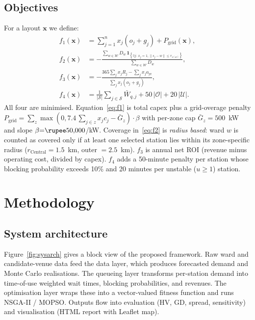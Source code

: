\documentclass[conference]{IEEEtran}
\begin{document}
\subsection{Objectives}
\label{subsec:objectives}
For a layout $\mathbf{x}$ we define:
\begin{align}
f_{1}(\mathbf{x})&= \sum_{j=1}^{n}x_{j}(o_{j}+g_{j})+P_{\text{grid}}(\mathbf{x}), \label{eq:f1}\\
f_{2}(\mathbf{x})&= -\frac{\sum_{w\in\mathcal{W}}D_{w}\,\mathbf{1}_{\left\{\exists j:\,x_{j}=1,\|s_{j}-w\|\le r_{z(w)}\right\}}}{\sum_{w\in\mathcal{W}}D_{w}}, \label{eq:f2}\\
f_{3}(\mathbf{x})&= -\frac{365\sum_{j}x_{j}R_{j}-\sum_{j}x_{j}o_{\text{yr}}}{\sum_{j}x_{j}(o_{j}+g_{j})}, \label{eq:f3}\\
f_{4}(\mathbf{x})&= \frac{1}{|\mathcal{S}|}\sum_{j\in\mathcal{S}}\bar W_{q,j}
                  +50\,\lvert\mathcal{O}\rvert+20\,\lvert\mathcal{U}\rvert. \label{eq:f4}
\end{align}
All four are minimised. Equation~\eqref{eq:f1} is total capex plus a
grid-overage penalty $P_{\text{grid}}=\!\!\!\sum_{z}\!\max(0,
7.4\,\sum_{j\in z}x_{j}c_{j}-\bar G_{z})\cdot\beta$ with per-zone cap
$\bar G_{z}=500$~kW and slope $\beta{=}\text{\rupee}50{,}000$/kW. Coverage
in~\eqref{eq:f2} is \emph{radius based}: ward $w$ is counted as covered
only if at least one selected station lies within its zone-specific
radius ($r_{\text{Central}}{=}1.5$~km, outer $=2.5$~km).
$f_{3}$ is annual net ROI (revenue minus operating cost, divided by
capex). $f_{4}$ adds a 50-minute penalty per station whose blocking
probability exceeds 10\% and 20 minutes per unstable
($u\ge1$) station.

\section{Methodology}
\label{sec:method}

\subsection{System architecture}
\label{subsec:sysarch}
Figure~\ref{fig:sysarch} gives a block view of the proposed
framework. Raw ward and candidate-venue data feed the data layer,
which produces forecasted demand and Monte Carlo realisations. The
queueing layer transforms per-station demand into time-of-use
weighted wait times, blocking probabilities, and revenues. The
optimisation layer wraps these into a vector-valued fitness function
and runs NSGA-II / MOPSO. Outputs flow into evaluation (HV, GD,
spread, sensitivity) and visualisation (HTML report with Leaflet
map).
\end{document}
